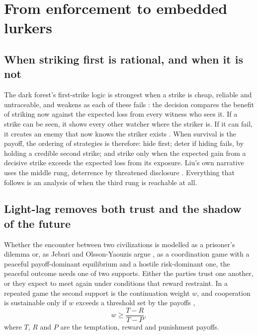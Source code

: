 \documentclass[preprint,12pt]{elsarticle}
\theoremstyle{definition}
\begin{document}
\section{From enforcement to embedded lurkers}
\label{sec:lurkers}

\subsection{When striking first is rational, and when it is not}
\label{sec:strikefirst}

The dark forest's first-strike logic is strongest when a strike is cheap, reliable and untraceable, and weakens as each of these fails \citep{Dam2026}: the decision compares the benefit of striking now against the expected loss from every witness who sees it. If a strike can be seen, it shows every other watcher where the striker is. If it can fail, it creates an enemy that now knows the striker exists \citep{Korhonen2013}. When survival is the payoff, the ordering of strategies is therefore: hide first; deter if hiding fails, by holding a credible second strike; and strike only when the expected gain from a decisive strike exceeds the expected loss from its exposure. Liu's own narrative uses the middle rung, deterrence by threatened disclosure \citep{Liu2008}. Everything that follows is an analysis of when the third rung is reachable at all.

\subsection{Light-lag removes both trust and the shadow of the future}
\label{sec:lightlag}

Whether the encounter between two civilizations is modelled as a prisoner's dilemma or, as Jebari and Olsson-Yaouzis argue \citep{JebariOlsson2018,JebariAsker2024}, as a coordination game with a peaceful payoff-dominant equilibrium and a hostile risk-dominant one, the peaceful outcome needs one of two supports. Either the parties trust one another, or they expect to meet again under conditions that reward restraint. In a repeated game the second support is the continuation weight $w$, and cooperation is sustainable only if $w$ exceeds a threshold set by the payoffs \citep{AxelrodHamilton1981},
\begin{equation}
w \geq \frac{T - R}{T - P},
\end{equation}
where $T$, $R$ and $P$ are the temptation, reward and punishment payoffs.
\end{document}
